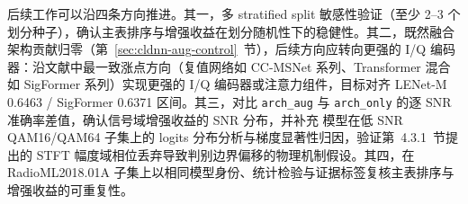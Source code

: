 后续工作可以沿四条方向推进。其一，多 stratified split 敏感性验证（至少 2--3 个划分种子），确认主表排序与增强收益在划分随机性下的稳健性。其二，既然融合架构贡献归零（第~\ref{sec:cldnn-aug-control}~节），后续方向应转向更强的 I/Q 编码器：沿文献中最一致涨点方向（复值网络如 CC-MSNet\cite{wang2024ccmsnet} 系列、Transformer 混合如 SigFormer\cite{cao2024sigformer} 系列）实现更强的 I/Q 编码器或注意力组件，目标对齐 LENet-M 0.6463 / SigFormer 0.6371 区间。其三，对比 \texttt{arch\_aug} 与 \texttt{arch\_only} 的逐 SNR 准确率差值，确认信号域增强收益的 SNR 分布，并补充  模型在低 SNR QAM16/QAM64 子集上的 logits 分布分析与梯度显著性归因，验证第~4.3.1~节提出的 STFT 幅度域相位丢弃导致判别边界偏移的物理机制假设。其四，在 RadioML2018.01A 子集上以相同模型身份、统计检验与证据标签复核主表排序与增强收益的可重复性。

